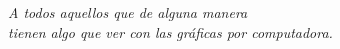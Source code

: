 \thispagestyle{empty}
\vspace*{8cm}
\begin{flushright}
\textit{A todos aquellos que de alguna manera \\
tienen algo que ver con las gráficas por computadora.}
\end{flushright}                 

